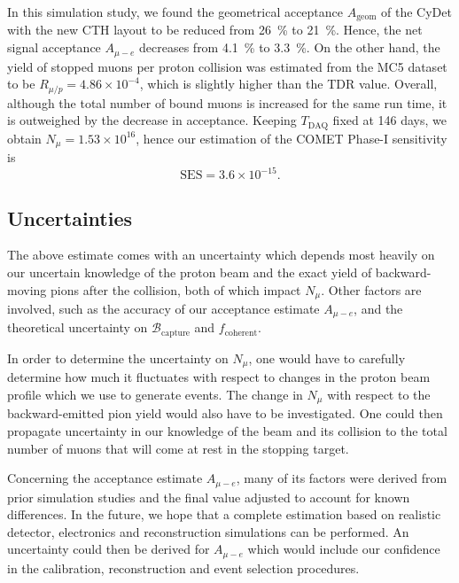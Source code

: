 In this simulation study, we found the geometrical acceptance $A_\mathrm{geom}$
of the CyDet with the new CTH layout to be reduced from \SI{26}{\percent} to
\SI{21}{\percent}. Hence, the net signal acceptance $A_{\mu-e}$ decreases from
\SI{4.1}{\percent} to \SI{3.3}{\percent}. On the other hand, the yield of
stopped muons per proton collision was estimated from the MC5 dataset to be
$R_{\mu / p} = 4.86 \times 10^{-4}$, which is slightly higher than the TDR
value. Overall, although the total number of bound muons is increased for the
same run time, it is outweighed by the decrease in acceptance. Keeping
$T_\mathrm{DAQ}$ fixed at 146 days, we obtain $N_\mu = 1.53 \times 10^{16}$,
hence our estimation of the COMET Phase\nobreakdash-I sensitivity is
\begin{equation}
\mathrm{SES} = 3.6 \times 10^{-15}.
\end{equation}

\subsection*{Uncertainties}
The above estimate comes with an uncertainty which depends most heavily on our
uncertain knowledge of the proton beam and the exact yield of backward-moving
pions after the collision, both of which impact $N_\mu$. Other factors are involved,
such as the accuracy of our acceptance estimate $A_{\mu-e}$, and the theoretical
uncertainty on $\mathcal{B}_\mathrm{capture}$ and $f_\mathrm{coherent}$.

In order to determine the uncertainty on $N_\mu$, one would have to carefully
determine how much it fluctuates with respect to changes in the proton beam
profile which we use to generate events. The change in $N_\mu$ with respect to
the backward-emitted pion yield would also have to be investigated. One could
then propagate uncertainty in our knowledge of the beam and its collision to the
total number of muons that will come at rest in the stopping target.

Concerning the acceptance estimate $A_{\mu-e}$, many of its factors were derived
from prior simulation studies and the final value adjusted to account for known
differences. In the future, we hope that a complete estimation based on
realistic detector, electronics and reconstruction simulations can be performed.
An uncertainty could then be derived for $A_{\mu-e}$ which would include our
confidence in the calibration, reconstruction and event selection procedures.



